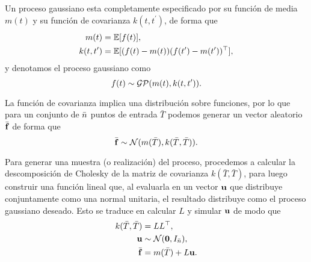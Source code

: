 Un proceso gaussiano esta completamente especificado por su función de media \(m(t)\) y su función de covarianza \(k(t, t^{\prime})\), de forma que
\begin{align*}
	m(t)				&= \mathbb{E}[f(t)],\\
	k(t, t^{\prime })	&= \mathbb{E}[(f(t)-m(t))(f(t^{\prime })-m(t^{\prime}))^{\top}],
\end{align*}
y denotamos el proceso gaussiano como
\begin{equation*}
	f(t) \sim \operatorname{\mathcal{GP}}(m(t), k(t, t^{\prime})).
\end{equation*}

La función de covarianza implica una distribución sobre funciones, por lo que para un conjunto de \(\bar{n}\) puntos de entrada \(\bar{T}\) podemos generar un vector aleatorio \(\bar{\mathbf{f}}\) de forma que
\begin{equation*}
	\bar{\mathbf{f}} \sim \mathcal{N}(m(\bar{T}), k(\bar{T}, \bar{T})).
\end{equation*}

Para generar una muestra (o realización) del proceso, procedemos a calcular la descomposición de Cholesky de la matriz de covarianza \(k(\bar{T}, \bar{T})\), para luego construir una función lineal que, al evaluarla en un vector \(\mathbf{u}\) que distribuye conjuntamente como una normal unitaria, el resultado distribuye como el proceso gaussiano deseado. Esto se traduce en calcular \(L\) y simular \(\mathbf{u}\) de modo que
\begin{align*}
	k(\bar{T}, \bar{T})	&= LL^{\top},\\
	\mathbf{u}				&\sim \mathcal{N}(\mathbf{0}, I_{\bar{n}}), \\
	\bar{\mathbf{f}}			&= m(\bar{T}) + L\mathbf{u}.
\end{align*}

